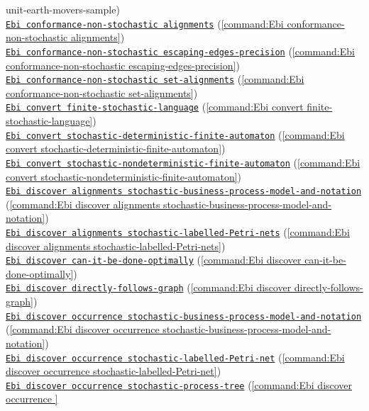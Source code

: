 {unit-earth-movers-sample})\\\null\qquad\hyperref[command:Ebi conformance-non-stochastic alignments]{\texttt{Ebi conformance-non-stochastic alignments}} (\cref{command:Ebi conformance-non-stochastic alignments})\\\null\qquad\hyperref[command:Ebi conformance-non-stochastic escaping-edges-precision]{\texttt{Ebi conformance-non-stochastic escaping-edges-precision}} (\cref{command:Ebi conformance-non-stochastic escaping-edges-precision})\\\null\qquad\hyperref[command:Ebi conformance-non-stochastic set-alignments]{\texttt{Ebi conformance-non-stochastic set-alignments}} (\cref{command:Ebi conformance-non-stochastic set-alignments})\\\null\qquad\hyperref[command:Ebi convert finite-stochastic-language]{\texttt{Ebi convert finite-stochastic-language}} (\cref{command:Ebi convert finite-stochastic-language})\\\null\qquad\hyperref[command:Ebi convert stochastic-deterministic-finite-automaton]{\texttt{Ebi convert stochastic-deterministic-finite-automaton}} (\cref{command:Ebi convert stochastic-deterministic-finite-automaton})\\\null\qquad\hyperref[command:Ebi convert stochastic-nondeterministic-finite-automaton]{\texttt{Ebi convert stochastic-nondeterministic-finite-automaton}} (\cref{command:Ebi convert stochastic-nondeterministic-finite-automaton})\\\null\qquad\hyperref[command:Ebi discover alignments stochastic-business-process-model-and-notation]{\texttt{Ebi discover alignments stochastic-business-process-model-and-notation}} (\cref{command:Ebi discover alignments stochastic-business-process-model-and-notation})\\\null\qquad\hyperref[command:Ebi discover alignments stochastic-labelled-Petri-nets]{\texttt{Ebi discover alignments stochastic-labelled-Petri-nets}} (\cref{command:Ebi discover alignments stochastic-labelled-Petri-nets})\\\null\qquad\hyperref[command:Ebi discover can-it-be-done-optimally]{\texttt{Ebi discover can-it-be-done-optimally}} (\cref{command:Ebi discover can-it-be-done-optimally})\\\null\qquad\hyperref[command:Ebi discover directly-follows-graph]{\texttt{Ebi discover directly-follows-graph}} (\cref{command:Ebi discover directly-follows-graph})\\\null\qquad\hyperref[command:Ebi discover occurrence stochastic-business-process-model-and-notation]{\texttt{Ebi discover occurrence stochastic-business-process-model-and-notation}} (\cref{command:Ebi discover occurrence stochastic-business-process-model-and-notation})\\\null\qquad\hyperref[command:Ebi discover occurrence stochastic-labelled-Petri-net]{\texttt{Ebi discover occurrence stochastic-labelled-Petri-net}} (\cref{command:Ebi discover occurrence stochastic-labelled-Petri-net})\\\null\qquad\hyperref[command:Ebi discover occurrence stochastic-process-tree]{\texttt{Ebi discover occurrence stochastic-process-tree}} (\cref{command:Ebi discover occurrence }
